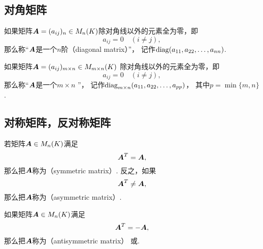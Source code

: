 \subsection{对角矩阵}
\begin{definition}
如果矩阵\(\boldsymbol{A}=(a_{ij})_n \in M_n(K)\)除对角线以外的元素全为零，即\begin{equation*}
	a_{ij} = 0
	\quad(i \neq j),
\end{equation*}
那么称“\(\boldsymbol{A}\)是一个\(n\)阶（diagonal matrix）”，
记作\(\operatorname{diag}(a_{11},a_{22},\dotsc,a_{nn})\).
\end{definition}

\begin{definition}
如果矩阵\(\boldsymbol{A}=(a_{ij})_{m \times n} \in M_{m \times n}(K)\)
除对角线以外的元素全为零，即\begin{equation*}
	a_{ij} = 0
	\quad(i \neq j),
\end{equation*}
那么称“\(\boldsymbol{A}\)是一个\(m \times n\) ”，
记作\(\operatorname{diag}_{m \times n}(a_{11},a_{22},\dotsc,a_{pp})\)，
其中\(p = \min\{m,n\}\).
\end{definition}

\subsection{对称矩阵，反对称矩阵}
\begin{definition}
若矩阵\(\boldsymbol{A} \in M_n(K)\)满足\begin{equation*}
    \boldsymbol{A}^T = \boldsymbol{A},
\end{equation*}
那么把\(\boldsymbol{A}\)称为（symmetric matrix）.
反之，如果\begin{equation*}
	\boldsymbol{A}^T \neq \boldsymbol{A},
\end{equation*}
那么把\(\boldsymbol{A}\)称为（asymmetric matrix）.
\end{definition}

\begin{definition}
如果矩阵\(\boldsymbol{A} \in M_n(K)\)满足\begin{equation*}
	\boldsymbol{A}^T = -\boldsymbol{A},
\end{equation*}
那么把\(\boldsymbol{A}\)称为（antisymmetric matrix）
或.
\end{definition}

